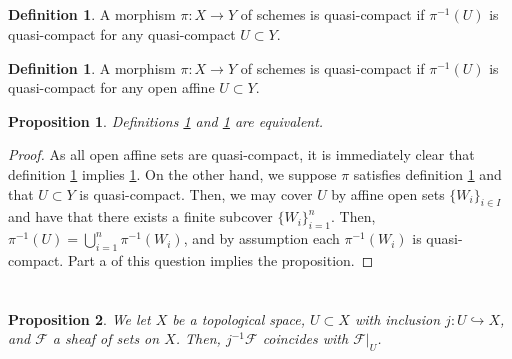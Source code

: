\documentclass[english,letter,doublesided]{article}
\newcommand{\evat}[3]{\left. #1\right|_{#2}^{#3}}
\newcommand{\Fcal}{\mathcal{F}}
\newcommand{\prob}[1]{\setcounter{section}{#1-1}\section{}}
\newcommand{\prt}[1]{\setcounter{subsection}{#1-1}\subsection{}}
\newtheorem*{proposition*}{Proposition}
\theoremstyle{remark}
\theoremstyle{definition}
\newtheorem{definition}[theorem]{Definition}
\newcommand{\restr}[2]{\evat{#1}{#2}{}}
\begin{document}
\prt{2}
\begin{definition}
	\label{def1} A morphism $\pi:X\to Y$ of schemes is quasi-compact if $\pi^{-1}(U)$ is quasi-compact for any quasi-compact $U\subset Y$.
\end{definition}
\begin{definition}
	\label{def2} A morphism $\pi:X\to Y$ of schemes is quasi-compact if $\pi^{-1}(U)$ is quasi-compact for any open affine $U\subset Y$.
\end{definition}
\begin{proposition*}
	Definitions \ref{def1} and \ref{def2} are equivalent.
\end{proposition*}
\begin{proof}
As all open affine sets are quasi-compact, it is immediately clear that definition \ref{def1} implies \ref{def2}. On the other hand, we suppose $\pi$ satisfies definition \ref{def2} and that $U\subset Y$ is quasi-compact. Then, we may cover $U$ by affine open sets $\{W_i\}_{i\in I}$ and have that there exists a finite subcover $\{W_i\}_{i=1}^n$. Then, $\pi^{-1}(U)=\bigcup_{i=1}^n \pi^{-1}(W_i)$, and by assumption each $\pi^{-1}(W_i)$ is quasi-compact. Part a of this question implies the proposition. 
\end{proof}
%
%
%
\prob{5}
%
%
%
\prob{6}
\begin{proposition*}
We let $X$ be a topological space, $U\subset X$ with inclusion $j:U\hookrightarrow X$, and $\Fcal$ a sheaf of sets on $X$. Then, $j^{-1}\Fcal$ coincides with $\restr{\Fcal}{U}$.
\end{proposition*}
\end{document}

